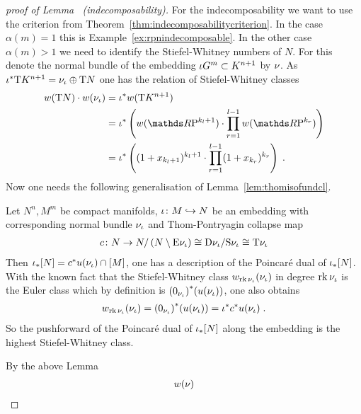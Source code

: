 \begin{proof}[proof of
  Lemma~
  (indecomposability)]
  For the indecomposability we want to use the criterion from
  Theorem~\ref{thm:indecomposabilitycriterion}. In the case
  $\alpha(m)=1$ this is Example~\ref{ex:rpnindecomposable}.
  In the other case $\alpha(m)>1$ we need to identify the
  Stiefel-Whitney numbers of $N$. For this denote the normal
  bundle of the embedding ${\iota}G^{m}\subset K^{n+1}$ by $\nu_{}$.
  As ${{\iota}}^*\mathrm{T}K^{n+1}=\nu_{{\iota}}\oplus\mathrm{T}N$ one has the relation
  of Stiefel-Whitney classes
  \begin{align*}
    \W{\T N} \cdot \W{\N\emb}
    &= \pb\emb\W{\T{K^{n+1}}} \\
    &= \pb\emb\left(
      \W{\RP{k_l+1}}
      \cdot \prod_{r=1}^{l-1}\W{\RP{k_r}}
      \right) \\
    &= \pb\emb\left(
      (1+x_{k_l+1})^{k_l+1}
      \cdot \prod_{r=1}^{l-1}(1+x_{k_r})^{k_r}
      \right)
      \;.
  \end{align*}
  Now one needs the following
  generalisation of Lemma~\ref{lem:thomisofundcl}.
  \begin{Lem}
    Let $N^n, M^m$ be compact manifolds, ${\iota}\colon M\hookrightarrow N$
    be an embedding with corresponding normal bundle $\nu_{{\iota}}$
    and Thom-Pontryagin collapse map
    \begin{gather*}
      c\colon
      N
      \to N/\left( N\setminus \mathrm{E}\nu_{{\iota}} \right)
      \cong \mathrm{D}\nu_{{\iota}} / \mathrm{S}\nu_{{\iota}}
      \cong \mathrm{T}{\nu_{{\iota}}}
    \end{gather*}
    Then
    ${{\iota}}_*[N] = {c}^*{u}(\nu_{{\iota}})\cap[M]$,
    \idest one has a description of the Poincaré dual of
    ${{\iota}}_*[N]$.
    With the known fact that the Stiefel-Whitney class
    ${w_{\operatorname{rk}\nu_{{\iota}}}}(\nu_{{\iota}})$ in degree $\operatorname{rk}{\nu_{{\iota}}}$ is the
    Euler class which by definition is
    ${(0_{\nu_{{\iota}}})}^*({u}(\nu_{{\iota}}))$, one also obtains
    \begin{gather*}
      {w_{\operatorname{rk}\nu_{{\iota}}}}(\nu_{{\iota}})
      = {(0_{\nu_{{\iota}}})}^*({u}(\nu_{{\iota}}))
      = {{\iota}}^*{c}^*{u}(\nu_{{\iota}})
      \;.
    \end{gather*}
    So the pushforward of the Poincaré dual of ${{\iota}}_*[N]$
    along the embedding is the highest Stiefel-Whitney class.
  \end{Lem}
  By the above Lemma
  \begin{gather*}
    \W{\N{}}

\end{gather*}
\end{proof}
